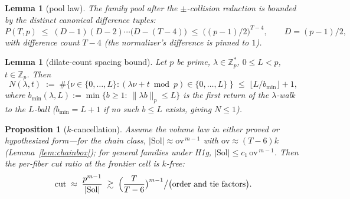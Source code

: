 \documentclass[11pt,a4paper]{article}
\numberwithin{equation}{section}
\theoremstyle{plain}
\theoremstyle{plain}
\newtheorem{lemma}[theorem]{Lemma}
\newtheorem{proposition}[theorem]{Proposition}
\theoremstyle{definition}
\theoremstyle{remark}
\newcommand{\Z}{\mathbb{Z}}
\begin{document}
\begin{lemma}[pool law]\label{lem:pool}
The family pool after the $\pm$-collision reduction is bounded by the
distinct canonical difference tuples:
\[
P(T,p)\;\le\;(D-1)(D-2)\cdots\bigl(D-(T-4)\bigr)
\;\le\;\bigl((p-1)/2\bigr)^{T-4},
\qquad D=(p-1)/2,
\]
with difference count $T-4$ (the normalizer's difference is pinned to
$1$).
\end{lemma}

\begin{lemma}[dilate-count spacing bound]\label{lem:spacing}
Let $p$ be prime, $\lambda\in\Z_p^*$, $0\le L<p$, $t\in\Z_p$. Then
\[
N(\lambda,t)\;:=\;\#\{\nu\in\{0,\dots,L\}:
(\lambda\nu+t\bmod p)\in\{0,\dots,L\}\;\}
\;\le\;\lfloor L/b_{\min}\rfloor+1,
\]
where $b_{\min}(\lambda,L):=\min\{b\ge 1:\ \|\lambda b\|_p\le L\}$ is
the first return of the $\lambda$-walk to the $L$-ball ($b_{\min}=L+1$
if no such $b\le L$ exists, giving $N\le 1$).
\end{lemma}

\begin{proposition}[$k$-cancellation]\label{prop:kcanc}
Assume the volume law in either proved or hypothesized form---for the
chain class, $|\mathrm{Sol}|\approx\mathrm{ov}^{\,m-1}$ with
$\mathrm{ov}\approx(T-6)k$ (Lemma~\ref{lem:chainbox}); for general
families under H1g, $|\mathrm{Sol}|\le c_1\,\mathrm{ov}^{\,m-1}$. Then
the per-fiber cut ratio at the frontier cell is $k$-free:
\[
\mathrm{cut}\;\approx\;\frac{p^{m-1}}{|\mathrm{Sol}|}
\;\gtrsim\;\Bigl(\frac{T}{T-6}\bigr)^{m-1}\big/\bigl(\text{order and
tie factors}\bigr).
\]
\end{proposition}
\end{document}
